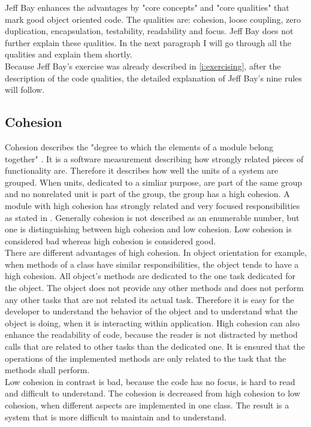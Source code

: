 Jeff Bay enhances the advantages by "core concepts" and "core qualities" that mark good object oriented code. The qualities are: cohesion, loose coupling, zero duplication, encapsulation, testability, readability and focus.
Jeff Bay does not further explain these qualities. In the next paragraph I will go through all the qualities and explain them shortly. \\

Because Jeff Bay's exercise was already described in \ref{i:exercising}, after the description of the code qualities, the detailed explanation of Jeff Bay's nine rules will follow. 

\subsection*{Cohesion}
\label{cohesion}
Cohesion describes the "degree to which the elements of a module belong together" \cite{cohesionBook}. It is a software measurement describing how strongly related pieces of functionality are. Therefore it describes how well the units of a system are grouped. When units, dedicated to a simliar purpose, are part of the same group and no nonrelated unit is part of the group, the group has a high cohesion. A module with high cohesion has strongly related and very focused responsibilities as stated in \cite[Cohesion]{wiki}. Generally cohesion is not described as an enumerable number, but one is distinguishing between high cohesion and low cohesion. Low cohesion is considered bad whereas high cohesion is considered good.\\

There are different advantages of high cohesion. In object orientation for example, when methods of a class have similar responsibilities, the object tends to have a high cohesion. All object's methods are dedicated to the one task dedicated for the object. The object does not provide any other methods and does not perform any other tasks that are not related its actual task. Therefore it is easy for the developer to understand the behavior of the object and to understand what the object is doing, when it is interacting within application. High cohesion can also enhance the readability of code, because the reader is not distracted by method calls that are related to other tasks than the dedicated one. It is ensured that the operations of the implemented methods are only related to the task that the methods shall perform. \\

Low cohesion in contrast is bad, because the code has no focus, is hard to read and difficult to understand. The cohesion is decreased from high cohesion to low cohesion, when different aspects are implemented in one class. The result is a system that is more difficult to maintain and to understand. 

